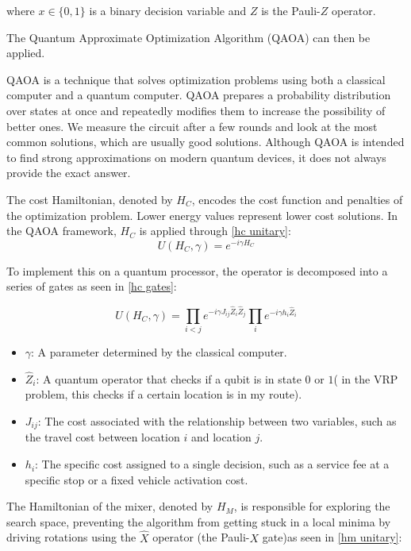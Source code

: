 \documentclass[a4paper]{report}
\begin{document}
{\begin{itemize}
where $x \in \{0,1\}$ is a binary decision variable and $Z$ is the Pauli-$Z$ operator.

The Quantum Approximate Optimization Algorithm (QAOA) can then be applied.


QAOA is a technique that solves optimization problems using both a classical computer and a quantum computer. QAOA prepares a probability distribution over states at once and repeatedly modifies them to increase the possibility of better ones. We measure the circuit after a few rounds and look at the most common solutions, which are usually good solutions. Although QAOA is intended to find strong approximations on modern quantum devices, it does not always provide the exact answer.



The cost Hamiltonian, denoted by $H_C$, encodes the cost function and penalties of the optimization problem. Lower energy values represent lower cost solutions. In the QAOA framework, $H_C$ is applied through \ref{hc unitary}:
\begin{equation}
U(H_C, \gamma) = e^{-i \gamma H_C}
\label{hc unitary}
\end{equation}

To implement this on a quantum processor, the operator is decomposed into a series of gates as seen in \ref{hc gates}:

\begin{equation}
U(H_C, \gamma) = \prod_{i<j} e^{-i \gamma J_{ij} \hat{Z}_i \hat{Z}_j} \prod_{i} e^{-i \gamma h_i \hat{Z}_i}
\label{hc gates}
\end{equation}
\begin{itemize}
    \item $\gamma$: A parameter determined by the classical computer.
  \item $\hat{Z}_i$: A quantum operator that checks if a qubit is in state $0$ or $1$( in the VRP problem, this checks if a certain location is in my route).
    \item $J_{ij}$: The cost associated with the relationship between two variables, such as the travel cost between location $i$ and location $j$.
    \item $h_i$: The specific cost assigned to a single decision, such as a service fee at a specific stop or a fixed vehicle activation cost.
\end{itemize}




The Hamiltonian of the mixer, denoted by $H_M$, is responsible for exploring the search space, preventing the algorithm from getting stuck in a local minima by driving rotations using  the $\hat{X}$ operator (the Pauli-$X$ gate)as seen in \ref{hm unitary}:


\end{itemize}}
\end{document}
